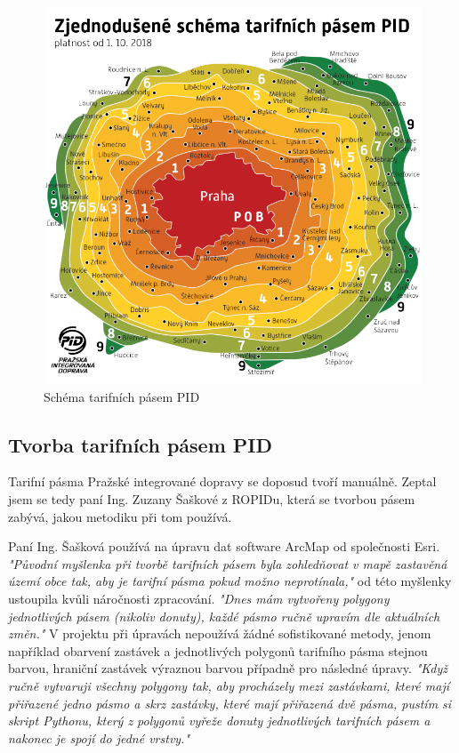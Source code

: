 \begin{figure}[H] \centering
    \includegraphics[width=400pt]{./pictures/pasma-schema.png}
    \caption[Schéma tarifních pásem PID]{Schéma tarifních pásem PID \cite{pid}}
	\label{fig:pasma-schema}                                
\end{figure}

\subsection{Tvorba tarifních pásem PID}

Tarifní pásma Pražské integrované dopravy se doposud tvoří manuálně. Zeptal jsem
se tedy paní Ing. Zuzany Šaškové z ROPIDu, která se tvorbou pásem zabývá, jakou metodiku
při tom používá. 

Paní Ing. Šašková používá na úpravu dat software ArcMap od společnosti Esri.
\textit{"Původní myšlenka při tvorbě tarifních pásem byla zohledňovat v mapě 
zastavěná území obce tak, aby je tarifní pásma pokud možno neprotínala,"} od této
myšlenky ustoupila kvůli náročnosti zpracování. \textit{"Dnes mám vytvořeny polygony 
jednotlivých pásem (nikoliv donuty), každé pásmo ručně upravím dle aktuálních změn."} 
V projektu při úpravách nepoužívá žádné sofistikované metody, jenom například obarvení
zastávek a jednotlivých polygonů tarifního pásma stejnou barvou, hraniční zastávek výraznou barvou 
případně pro následné úpravy. \textit{"Když ručně vytvaruji všechny polygony tak, aby procházely 
mezi zastávkami, které mají přiřazené jedno pásmo a skrz zastávky, které mají přiřazená dvě pásma, 
pustím si skript Pythonu, který z polygonů vyřeže donuty jednotlivých tarifních pásem a nakonec je spojí do jedné vrstvy."}

